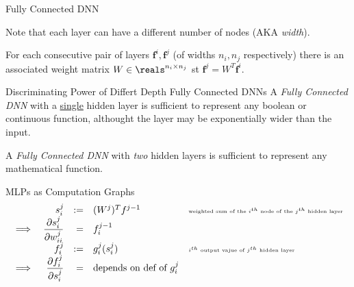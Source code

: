 \documentclass[11pt,a4paper]{article}
\begin{document}
\begin{definition}{Fully Connected DNN}
\begin{center}
\end{center}
    Note that each layer can have a different number of nodes (AKA \textit{width}).
    \par For each consecutive pair of layers $\pmb{f}^i,\pmb{f}^j$ (of widths $n_i,n_j$ respectively) there is an associated weight matrix $W\in\reals^{n_i\times n_j}$ st $\pmb{f}^j=W^T\pmb{f}^i$.
  \end{definition}

  \begin{remark}{Discriminating Power of Differt Depth Fully Connected DNNs}
    A \textit{Fully Connected DNN} with a \underline{single} hidden layer is sufficient to represent any boolean or continuous function, althought the layer may be exponentially wider than the input.
    \par A \textit{Fully Connected DNN} with \textit{two} hidden layers is sufficient to represent any mathematical function.
  \end{remark}

  \begin{proposition}{MLPs as Computation Graphs}
    \[\begin{array}{rrrll}
      &s_i^j&:=&(W^j)^Tf^{j-1}&\tiny\text{weighted sum of the $i^{th}$ node of the $j^{th}$ hidden layer}\\
      \implies&\dfrac{\partial s_i^j}{\partial w_{ii}^j}&=&f_i^{j-1}\\
      &f_i^j&:=&g_i^j(s_i^j)&\tiny\text{$i^{th}$ output vajue of $j^{th}$ hidden layer}\\
      \implies&\dfrac{\partial f_i^j}{\partial s_i^j}&=&\text{depends on def of }g_i^j
    \end{array}\]
  \end{proposition}
\end{document}
